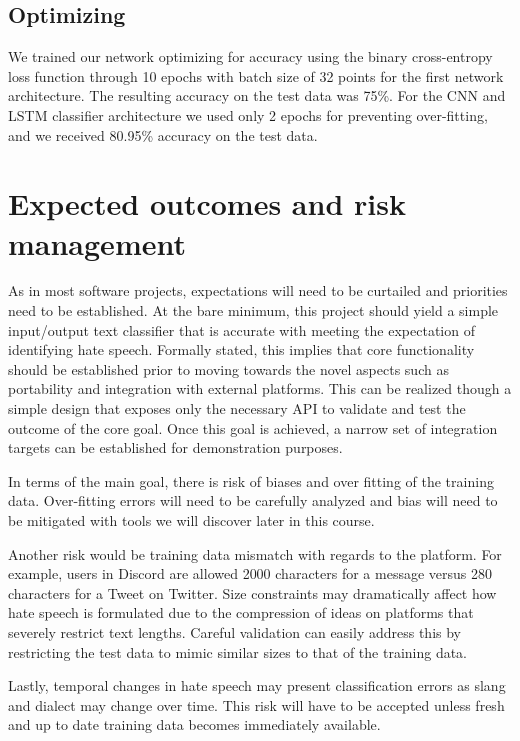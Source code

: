 \documentclass[conference]{sig-alternate-05-2015}
\begin{document}
\subsection{Optimizing}
We trained our network optimizing for accuracy using the binary cross-entropy loss function through 10 epochs with batch size of 32 points for the first network architecture. The resulting accuracy on the test data was 75\%. For the CNN and LSTM classifier architecture we used only 2 epochs for preventing over-fitting, and we received 80.95\% accuracy on the test data.


\section{Expected outcomes and risk management}

As in most software projects, expectations will need to be curtailed and priorities need to be established.  At the bare minimum, this project should yield a simple input/output text classifier that is accurate with meeting the expectation of identifying hate speech.  Formally stated, this implies that core functionality should be established prior to moving towards the novel aspects such as portability and integration with external platforms.  This can be realized though a simple design that exposes only the necessary API to validate and test the outcome of the core goal.  Once this goal is achieved, a narrow set of integration targets can be established for demonstration purposes.

In terms of the main goal, there is risk of biases and over fitting of the training data.  Over-fitting errors will need to be carefully analyzed and bias will need to be mitigated with tools we will discover later in this course.

Another risk would be training data mismatch with regards to the platform.  For example, users in Discord are allowed 2000 characters for a message versus 280 characters for a Tweet on Twitter.  Size constraints may dramatically affect how hate speech is formulated due to the compression of ideas on platforms that severely restrict text lengths.  Careful validation can easily address this by restricting the test data to mimic similar sizes to that of the training data.

Lastly, temporal changes in hate speech may present classification errors as slang and dialect may change over time.  This risk will have to be accepted unless fresh and up to date training data becomes immediately available.
\end{document}
